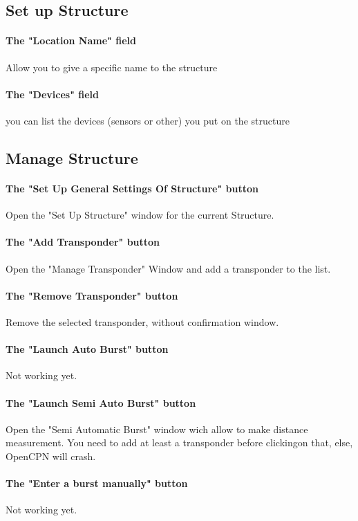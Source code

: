 \documentclass[11pt]{report}
\begin{document}
        \vspace{1cm}
        \subsection{Set up Structure}
            \paragraph{The "Location Name" field}Allow you to give a specific name to the structure
            \paragraph{The "Devices" field} you can list the devices (sensors or other) you put on the structure

        \vspace{1cm}
        \subsection{Manage Structure}
            \paragraph{The "Set Up General Settings Of Structure" button} Open the "Set Up Structure" window for the current Structure.
            \paragraph{The "Add Transponder" button} Open the "Manage Transponder" Window and add a transponder to the list.
            \paragraph{The "Remove Transponder" button}Remove the selected transponder, without confirmation window.
            \paragraph{The "Launch Auto Burst" button} Not working yet.
            \paragraph{The "Launch Semi Auto Burst" button} Open the "Semi Automatic Burst" window wich allow to make distance measurement. You need to add at least a 
            transponder before clickingon that, else, OpenCPN will crash.
            \paragraph{The "Enter a burst manually" button} Not working yet.
\end{document}
